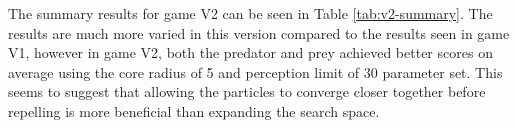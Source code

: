 The summary results for game V2 can be seen in Table \ref{tab:v2-summary}. The results are much more varied in this version compared to the results seen in game V1, however in game V2, both the predator and prey achieved better scores on average using the core radius of 5 and perception limit of 30 parameter set. This seems to suggest that allowing the particles to converge closer together before repelling is more beneficial than expanding the search space.
